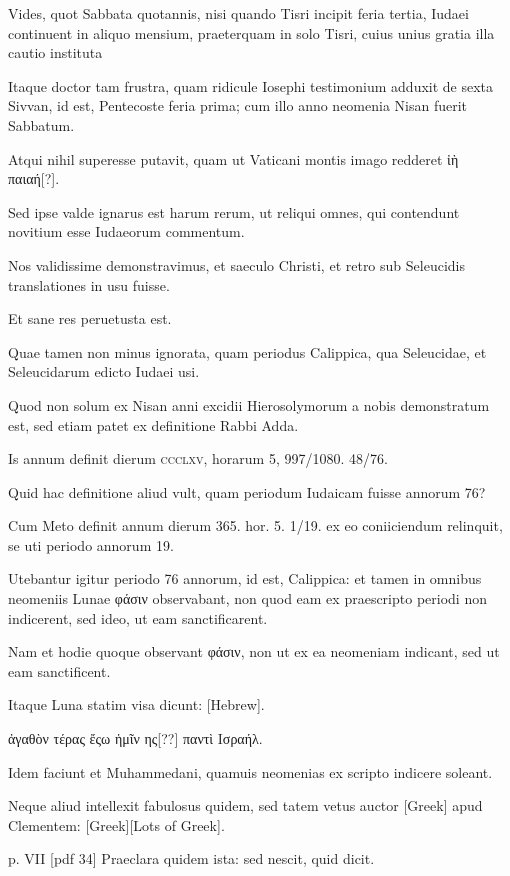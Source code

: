 \begin{parnumbers}
Vides, quot Sabbata quotannis, nisi quando Tisri incipit feria tertia, Iudaei
continuent in aliquo mensium, praeterquam in solo Tisri, cuius
unius gratia illa cautio instituta

Itaque doctor tam frustra, quam ridicule
Iosephi testimonium adduxit de sexta Sivvan, id est, Pentecoste
feria prima; cum illo anno neomenia Nisan fuerit Sabbatum.

Atqui
nihil superesse putavit, quam ut Vaticani montis imago redderet
\textgreek{ἰὴ παιαή[?]}.

Sed ipse valde ignarus est harum rerum, ut reliqui omnes,
qui contendunt novitium esse Iudaeorum commentum.

Nos
validissime demonstravimus, et saeculo Christi, et retro sub Seleucidis
translationes in usu fuisse.

Et sane res peruetusta est.

Quae tamen
non minus ignorata, quam periodus Calippica, qua Seleucidae, et
Seleucidarum edicto Iudaei usi.

Quod non solum ex Nisan anni excidii
Hierosolymorum a nobis demonstratum est, sed etiam patet
ex definitione Rabbi Adda.

Is annum definit dierum \textsc{ccclxv},
horarum 5, 997/1080. 48/76.

Quid hac definitione aliud vult, quam periodum
Iudaicam fuisse annorum 76?

Cum Meto definit annum dierum
365. hor. 5. 1/19. ex eo coniiciendum relinquit, se uti periodo annorum
19.

Utebantur igitur periodo 76 annorum, id est, Calippica:
et tamen in omnibus neomeniis Lunae \textgreek{φάσιν} observabant, non
quod eam ex praescripto periodi non indicerent, sed ideo, ut eam
sanctificarent.

Nam et hodie quoque observant \textgreek{φάσιν}, non ut ex ea
neomeniam indicant, sed ut eam sanctificent.

Itaque Luna statim
visa dicunt: \texthebrew{[Hebrew]}.

\textgreek{ἀγαθὸν τέρας ἔςω ἡμῖν ης[??] παντὶ Ισραήλ.}

Idem faciunt et Muhammedani, quamuis neomenias ex
scripto indicere soleant.

Neque aliud intellexit fabulosus quidem,
sed tatem vetus auctor \textgreek{[Greek]} apud Clementem:
\textgreek{[Greek][Lots of Greek]}.

\clearpage
p. VII [pdf 34]
Praeclara quidem ista: sed nescit, quid dicit.


\end{parnumbers}
